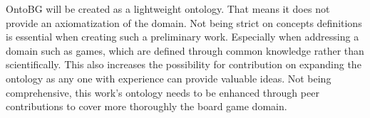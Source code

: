OntoBG will be created as a lightweight ontology. That means it does not provide an axiomatization of the domain. Not being strict on concepts definitions is essential when creating such a preliminary work. Especially when addressing a domain such as games, which are defined through common knowledge rather than scientifically. This also increases the possibility for contribution on expanding the ontology as any one with experience can provide valuable ideas. Not being comprehensive, this work's ontology needs to be enhanced through peer contributions to cover more thoroughly the board game domain.
